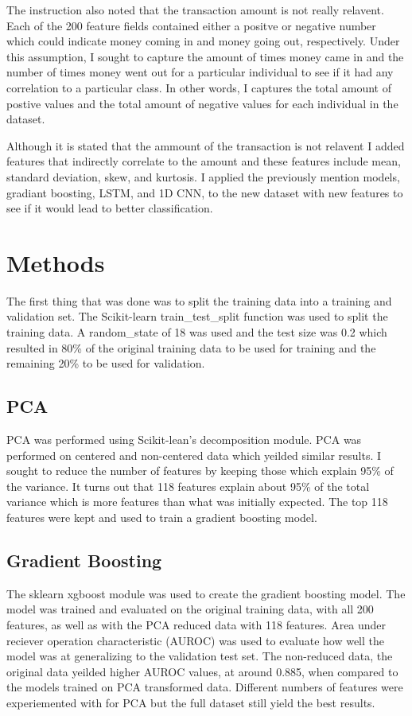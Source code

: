 \documentclass[11pt,letterpaper]{article}
\begin{document}
The instruction also noted that the transaction amount is not really relavent.
Each of the 200 feature fields contained either a positve or negative number
which could indicate money coming in and money going out, respectively.  Under
this assumption, I sought to capture the amount of times money came in and the
number of times money went out for a particular individual to see if it had any
correlation to a particular class.  In other words, I captures the total amount
of postive values and the total amount of negative values for each individual in
the dataset.  

Although it is stated that the ammount of the transaction is not relavent I
added features that indirectly correlate to the amount and these features
include mean, standard deviation, skew, and kurtosis.  I applied the previously
mention models, gradiant boosting, LSTM, and 1D CNN, to the new dataset with new
features to see if it would lead to better classification. 

\section{Methods}
The first thing that was done was to split the training data into a training and
validation set.  The Scikit-learn train\_test\_split function was used to split
the training data.  A random\_state of 18 was used and the test size was 0.2
which resulted in 80\% of the original training data to be used for training and
the remaining 20\% to be used for validation.  

\subsection{PCA}
PCA was performed using Scikit-lean's decomposition module.  PCA was performed
on centered and non-centered data which yeilded similar results.  I sought to
reduce the number of features by keeping those which explain 95\% of the
variance.  It turns out that 118 features explain about 95\% of the total
variance which is more features than what was initially expected.  The top 118
features were kept and used to train a gradient boosting model.
 
\subsection{Gradient Boosting}
The sklearn xgboost module was used to create the gradient boosting model. The
model was trained and evaluated on the original training data, with all 200
features, as well as with the PCA reduced data with 118 features.  Area under
reciever operation characteristic (AUROC) was used to evaluate how well the
model was at generalizing to the validation test set.  The non-reduced data, the
original data yeilded higher AUROC values, at around 0.885, when compared to the
models trained on PCA transformed data.  Different numbers of features were
experiemented with for PCA but the full dataset still yield the best results.
\end{document}
